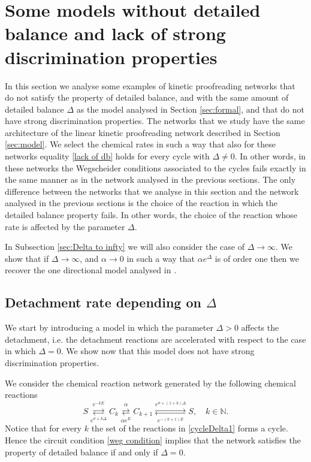\documentclass{article}
\numberwithin{equation}{section}
\theoremstyle{plain}
\begin{document}
\section{Some models without detailed balance and lack of strong discrimination properties} \label{sec:alterantive models no db and no disc}
In this section we analyse some examples of kinetic proofreading networks that do not satisfy the property of detailed balance, and with the same amount of detailed balance $\Delta$ as the model analysed in Section \ref{sec:formal}, and that do not have strong discrimination properties.
The networks that we study have the same architecture of the linear kinetic proofreading network described in Section \ref{sec:model}.
We select the chemical rates in such a way that also for these networks equality \eqref{lack of db} holds for every cycle with $\Delta \neq 0$. In other words, in these networks the Wegscheider conditions associated to the cycles fails exactly in the same manner as in the network analysed in the previous sections. 
The only difference between the networks that we analyse in this section and the network analysed in the previous sections is the choice of the reaction in which the detailed balance property fails. In other words, the choice of the reaction whose rate is affected by the parameter $\Delta $. 

In Subsection \ref{sec:Delta to infty} we will also consider the case of $\Delta \to \infty $.
We show that if $\Delta \to \infty $, and $ \alpha \to 0 $ in such a way that $\alpha e^\Delta $ is of order one then we recover the one directional model analysed in \cite{franco2025stochastic}. 

\subsection{Detachment rate depending on $\Delta $}
We start by introducing a model in which the parameter $\Delta >0$ affects the detachment, i.e. the detachment reactions are accelerated with respect to the case in which $\Delta =0$. 
We show now that this model does not have strong discrimination properties. 

We consider the chemical reaction network generated by the following chemical reactions 
\begin{equation}\label{cycleDelta1}
S \overset{e^{- k E} }{\underset{e^{\sigma+ k \Delta }} \rightleftarrows} C_k  \overset{\alpha  }{\underset{\alpha e^E }\rightleftarrows } C_{k+1} \overset{e^{\sigma+ (1+k) \Delta }}{\underset{e^{- (k+1)E}} \rightleftarrows} S, \quad  k  \in \mathbb N. 
\end{equation}
Notice that for every $k $ the set of the reactions in \eqref{cycleDelta1} forms a cycle. Hence the circuit condition \eqref{weg condition} implies that the network satisfies the property of detailed balance if and only if $\Delta =0$. 
\end{document}
